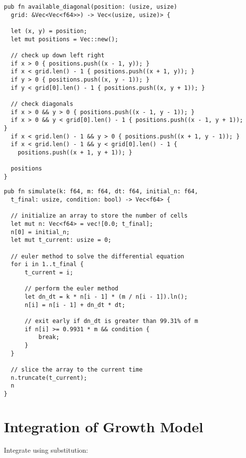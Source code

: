 \begin{lstlisting}[caption=Available Diagonal (Rust), label={lst:availableDiagonal},captionpos=b]
pub fn available_diagonal(position: (usize, usize)
  grid: &Vec<Vec<f64>>) -> Vec<(usize, usize)> {

  let (x, y) = position;
  let mut positions = Vec::new();

  // check up down left right
  if x > 0 { positions.push((x - 1, y)); }
  if x < grid.len() - 1 { positions.push((x + 1, y)); }
  if y > 0 { positions.push((x, y - 1)); }
  if y < grid[0].len() - 1 { positions.push((x, y + 1)); }

  // check diagonals
  if x > 0 && y > 0 { positions.push((x - 1, y - 1)); }
  if x > 0 && y < grid[0].len() - 1 { positions.push((x - 1, y + 1)); }
  if x < grid.len() - 1 && y > 0 { positions.push((x + 1, y - 1)); }
  if x < grid.len() - 1 && y < grid[0].len() - 1 { 
    positions.push((x + 1, y + 1)); }

  positions
}
\end{lstlisting}

\clearpage

\begin{lstlisting}[caption=Growth Model (Rust), label={lst:growthModel},captionpos=b]
pub fn simulate(k: f64, m: f64, dt: f64, initial_n: f64,
  t_final: usize, condition: bool) -> Vec<f64> {
    
  // initialize an array to store the number of cells
  let mut n: Vec<f64> = vec![0.0; t_final];
  n[0] = initial_n;
  let mut t_current: usize = 0;

  // euler method to solve the differential equation
  for i in 1..t_final {
      t_current = i;

      // perform the euler method
      let dn_dt = k * n[i - 1] * (m / n[i - 1]).ln();
      n[i] = n[i - 1] + dn_dt * dt;

      // exit early if dn_dt is greater than 99.31% of m
      if n[i] >= 0.9931 * m && condition {
          break;
      }
  }
  
  // slice the array to the current time
  n.truncate(t_current);
  n
}
\end{lstlisting}


\clearpage

\section{Integration of Growth Model} \label{sec:substitution}

Integrate using substitution:

